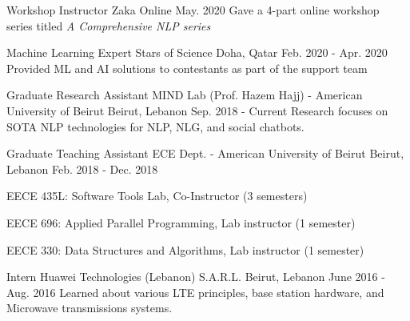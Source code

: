 

\begin{cventries}

  \cventry
    {Workshop Instructor } %
    {Zaka} %
    {Online} %
    {May. 2020} %
    {Gave a 4-part online workshop series titled \textit{A Comprehensive NLP  series}}

  \cventry
    {Machine Learning Expert} %
    {Stars of Science} %
    {Doha, Qatar} %
    {Feb. 2020 - Apr. 2020} %
    {Provided ML and AI solutions to contestants as part of the support team\smallskip}




  \cventry
    {Graduate Research Assistant} %
    {MIND Lab (Prof. Hazem Hajj) - American University of Beirut} %
    {Beirut, Lebanon} %
    {Sep. 2018 - Current} %
    {Research focuses on SOTA NLP technologies for NLP, NLG, and social chatbots.}


  \cventry
    {Graduate Teaching Assistant} %
    {ECE Dept. - American University of Beirut} %
    {Beirut, Lebanon} %
    {Feb. 2018 - Dec. 2018} %
    { 
      \begin{cvitems} %
        \item {EECE 435L: Software Tools Lab, Co-Instructor (3 semesters)}
        \item {EECE 696: Applied Parallel Programming, Lab instructor (1 semester)}
        \item {EECE 330: Data Structures and Algorithms, Lab instructor (1 semester)}
      \end{cvitems}
    }

  \cventry
    {Intern} %
    {Huawei Technologies (Lebanon) S.A.R.L.} %
    {Beirut, Lebanon} %
    {June 2016  - Aug. 2016} %
    {Learned about various LTE principles, base station hardware, and Microwave transmissions systems.}


\end{cventries}
